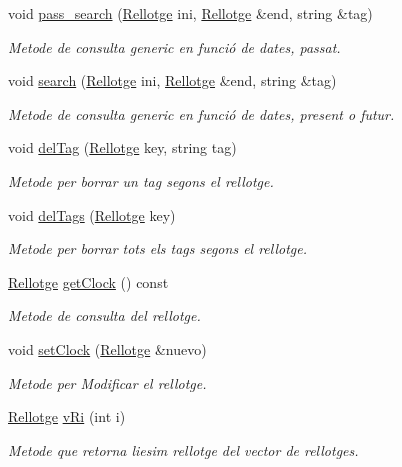 \begin{DoxyCompactItemize}
void \hyperlink{class_agenda_a15230e9ccd88c84d4333fe1e576d9724}{pass\+\_\+search} (\hyperlink{class_rellotge}{Rellotge} ini, \hyperlink{class_rellotge}{Rellotge} \&end, string \&tag)
\begin{DoxyCompactList}\small\item\em Metode de consulta generic en funció de dates, passat. \end{DoxyCompactList}\item 
void \hyperlink{class_agenda_a2e07bd3ed34c3bd86455f7df9af40aef}{search} (\hyperlink{class_rellotge}{Rellotge} ini, \hyperlink{class_rellotge}{Rellotge} \&end, string \&tag)
\begin{DoxyCompactList}\small\item\em Metode de consulta generic en funció de dates, present o futur. \end{DoxyCompactList}\item 
void \hyperlink{class_agenda_a92735b9739edfdd888e6c8a50a9a9a1e}{del\+Tag} (\hyperlink{class_rellotge}{Rellotge} key, string tag)
\begin{DoxyCompactList}\small\item\em Metode per borrar un tag segons el rellotge. \end{DoxyCompactList}\item 
void \hyperlink{class_agenda_aab25168e626608ef9c2cc251614fb657}{del\+Tags} (\hyperlink{class_rellotge}{Rellotge} key)
\begin{DoxyCompactList}\small\item\em Metode per borrar tots els tags segons el rellotge. \end{DoxyCompactList}\item 
\hyperlink{class_rellotge}{Rellotge} \hyperlink{class_agenda_a2fa68356644c21af8972f96a6813cfaf}{get\+Clock} () const 
\begin{DoxyCompactList}\small\item\em Metode de consulta del rellotge. \end{DoxyCompactList}\item 
void \hyperlink{class_agenda_a80618f5a47f57db497057ff2c6767d0d}{set\+Clock} (\hyperlink{class_rellotge}{Rellotge} \&nuevo)
\begin{DoxyCompactList}\small\item\em Metode per Modificar el rellotge. \end{DoxyCompactList}\item 
\hyperlink{class_rellotge}{Rellotge} \hyperlink{class_agenda_aa182a77ef545679224988e47f7d889a1}{v\+Ri} (int i)
\begin{DoxyCompactList}\small\item\em Metode que retorna l\textquotesingle{}iesim rellotge del vector de rellotges. \end{DoxyCompactList}\item 

\end{DoxyCompactItemize}
